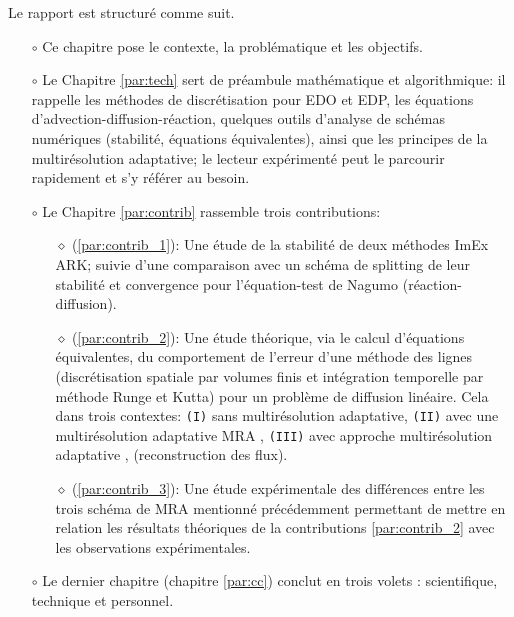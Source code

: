 Le rapport est structuré comme suit.
\begin{itemize}
\item[$\circ$] Ce chapitre pose le contexte, la problématique et les objectifs.
\item[$\circ$] Le Chapitre \ref{par:tech} sert de préambule mathématique et algorithmique:
il rappelle les méthodes de discrétisation pour EDO et EDP, les équations d'advection-diffusion-réaction, 
quelques outils d'analyse de schémas numériques (stabilité, équations équivalentes), ainsi que les principes de la multirésolution adaptative; 
le lecteur expérimenté peut le parcourir rapidement et s'y référer au besoin.
\item[$\circ$] Le Chapitre \ref{par:contrib} rassemble trois contributions:
\begin{itemize}
    \item[$\diamond$] (\ref{par:contrib_1}): Une étude de la stabilité de deux méthodes ImEx ARK;
    suivie d'une comparaison avec un schéma de splitting de leur stabilité et convergence pour l'équation-test de Nagumo (réaction-diffusion).
    \item[$\diamond$] (\ref{par:contrib_2}): Une étude théorique, via le calcul d'équations équivalentes, 
    du comportement de l'erreur d'une méthode des lignes (discrétisation spatiale par volumes finis et intégration temporelle par méthode Runge et Kutta) pour un problème de diffusion linéaire.
    Cela dans trois contextes: 
    \texttt{(I)} sans multirésolution adaptative, 
    \texttt{(II)} avec une multirésolution adaptative MRA ,
    \texttt{(III)} avec approche multirésolution adaptative , (reconstruction des flux).
    \item[$\diamond$] (\ref{par:contrib_3}): Une étude expérimentale des différences entre les trois schéma de MRA mentionné précédemment 
    permettant de mettre en relation les résultats théoriques de la contributions \ref{par:contrib_2} avec les observations expérimentales.
\end{itemize}
\item[$\circ$] Le dernier chapitre (chapitre \ref{par:cc}) conclut en trois volets : scientifique, technique et personnel.
\end{itemize}